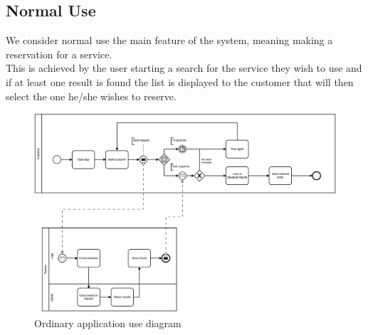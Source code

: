 \subsection{Normal Use}
We consider normal use the main feature of the system, meaning making a reservation for a service.\\
This is achieved by the user starting a search for the service they wish to use and if at least one result is found the list is displayed to the customer that will then select the one he/she wishes to reserve.
\begin{figure}[!htb]
\centering
\includegraphics[width=1.0\textwidth, angle = 90]{Img/DiagramNormalUse.jpg}
\caption{Ordinary application use diagram}
\end{figure}
\clearpage
